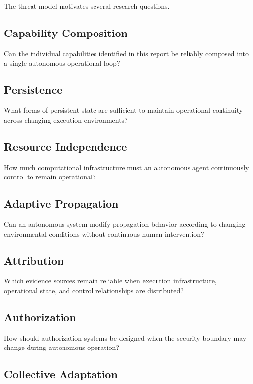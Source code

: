 \documentclass[11pt,a4paper]{article}
\begin{document}
The threat model motivates several research questions.

\subsection{Capability Composition}

Can the individual capabilities identified in this report be reliably
composed into a single autonomous operational loop?

\subsection{Persistence}

What forms of persistent state are sufficient to maintain operational
continuity across changing execution environments?

\subsection{Resource Independence}

How much computational infrastructure must an autonomous agent continuously
control to remain operational?

\subsection{Adaptive Propagation}

Can an autonomous system modify propagation behavior according to changing
environmental conditions without continuous human intervention?

\subsection{Attribution}

Which evidence sources remain reliable when execution infrastructure,
operational state, and control relationships are distributed?

\subsection{Authorization}

How should authorization systems be designed when the security boundary may
change during autonomous operation?

\subsection{Collective Adaptation}
\end{document}
